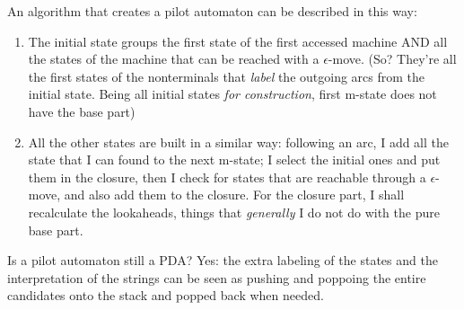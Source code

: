 				An algorithm that creates a pilot automaton can be described in this way:
				\begin{enumerate}
					\item The initial state groups the first state of the first accessed machine AND all the states of the machine that can be reached with a 
					$\epsilon$-move. (So? They're all the first states of the nonterminals that \emph{label} the outgoing arcs from the initial state. Being 
					all initial states \emph{for construction}, first m-state does not have the base part)
					\item All the other states are built in a similar way: following an arc, I add all the state that I can found to the next m-state; I select 
					the initial ones and put them in the closure, then I check for states that are reachable through a $\epsilon$-move, and also add them to the 
					closure. For the closure part, I shall recalculate the lookaheads, things that \emph{generally} I do not do with the pure base part.
				\end{enumerate}
				Is a pilot automaton still a PDA? Yes: the extra labeling of the states and the interpretation of the strings can be seen as pushing and poppoing 
				the entire candidates onto the stack and popped back when needed.
				
